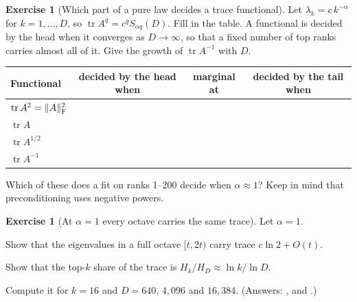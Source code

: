 \documentclass[11pt,a4paper]{article}
\DeclareMathOperator{\tr}{tr}
\DeclarePairedDelimiter{\norm}{\lVert}{\rVert}
\newcommand{\F}{\mathrm{F}}
\theoremstyle{plain}
\theoremstyle{definition}
\newtheorem{exercise}[proposition]{Exercise}
\theoremstyle{remark}
\begin{document}
\begin{exercise}[Which part of a pure law decides a trace functional]\label{ex:table}
Let $\lambda_k=c\,k^{-\alpha}$ for $k=1,\dots,D$, so $\tr A^q=c^qS_{\alpha q}(D)$. Fill in the table. A functional is
decided by the head when it converges as $D\to\infty$, so that a fixed number of top ranks carries almost all of it.
Give the growth of $\tr A^{-1}$ with $D$.
\begin{center}
\begin{tabular}{lccc}
\toprule
Functional & decided by the head when & marginal at & decided by the tail when\\
\midrule
$\tr A^2=\norm{A}_\F^2$ & \hspace{6em} & \hspace{4em} & \hspace{6em}\\
$\tr A$ & & & \\
$\tr A^{1/2}$ & & & \\
$\tr A^{-1}$ & & & \\
\bottomrule
\end{tabular}
\end{center}
Which of these does a fit on ranks 1--200 decide when $\alpha\approx1$? Keep in mind that preconditioning uses
negative powers.
\end{exercise}

\begin{exercise}[At $\alpha=1$ every octave carries the same trace]\label{ex:octave}
Let $\alpha=1$.
\begin{steps}
\item Show that the eigenvalues in a full octave $[t,2t)$ carry trace $c\ln2+O(t)$.
\item Show that the top-$k$ share of the trace is $H_k/H_D\approx\ln k/\ln D$.
\item Compute it for $k=16$ and $D=640$, $4{,}096$ and $16{,}384$. (Answers: \NumShareSixForty, \NumShareFourK{} and
  \NumShareSixteenK.)
\end{steps}
\end{exercise}
\end{document}
